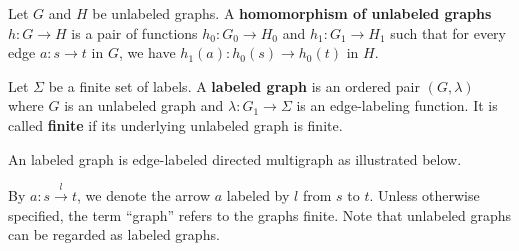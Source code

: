     \begin{definition}
        \label{def:unlabeled_graph:homomorphism}
        Let \( G \) and \( H \) be unlabeled graphs. A \textbf{homomorphism of unlabeled graphs} $h: G \to H$ is a pair of functions $h_0: G_0 \to H_0 $ and $h_1: G_1 \to H_1$ such that for every edge \( a: s \to t \) in \( G \), we have \( h_1(a) : h_0(s) \to h_0(t) \) in \( H \).
    \end{definition}
    \begin{definition}
        \label{def:graph}
        Let \(\Sigma\) be a finite set of labels. A \textbf{labeled graph} is an ordered pair \((G,\lambda)\) where \( G \) is an unlabeled graph and \( \lambda : G_1 \rightarrow \Sigma\) is an edge-labeling function. 
        It is called \textbf{finite} if its underlying unlabeled graph is finite.  
    \end{definition}
    \begin{example} An labeled graph is edge-labeled directed multigraph as illustrated below.
       
        \begin{center}
      \end{center} 
    \end{example}
    By $a : s\overset{l}{\rightarrow} t$, we denote the arrow $a$ labeled by $l$ from $s$ to $t$. Unless otherwise specified, the term \enquote{graph} refers to the graphs finite. Note that unlabeled graphs can be regarded as labeled graphs. 

